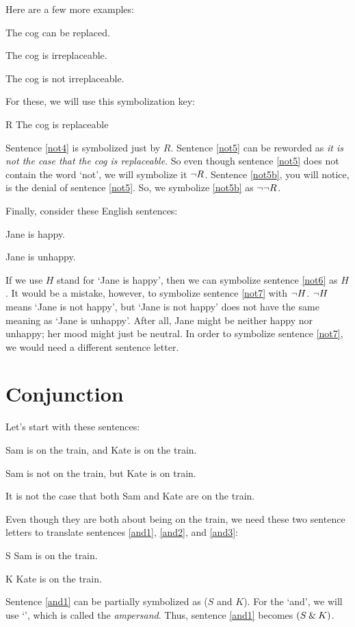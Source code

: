 Here are a few more examples:
	\begin{earg}
		\item[\ex{not4}] The cog can be replaced.
		\item[\ex{not5}] The cog is irreplaceable.
		\item[\ex{not5b}] The cog is not irreplaceable.
	\end{earg}
For these, we will use this symbolization key:
	\begin{ekey}
		\item[R] The cog is replaceable
	\end{ekey}
Sentence \ref{not4} is symbolized just by $R$. Sentence \ref{not5} can be reworded as \textit{it is not the case that the cog is replaceable}. So even though sentence \ref{not5} does not contain the word `not', we will symbolize it ${\neg} R$.
Sentence \ref{not5b}, you will notice, is the denial of sentence \ref{not5}. So, we symbolize \ref{not5b} as ${\neg}{\neg} R$.

Finally, consider these English sentences:
	\begin{earg}
		\item[\ex{not6}] Jane is happy.
		\item[\ex{not7}] Jane is unhappy.
	\end{earg}
If we use $H$ stand for `Jane is happy', then we can symbolize sentence \ref{not6} as $H$. It would be a mistake, however, to symbolize sentence \ref{not7} with ${\neg}{H}$. 
${\neg}{H}$ means `Jane is not happy', but `Jane is not happy' does not have the same meaning as `Jane is unhappy'. After all, Jane might be neither happy nor unhappy; her mood might just be neutral. In order to symbolize sentence \ref{not7}, we would need a different sentence letter.


\section{Conjunction}
\label{s:ConnectiveConjunction}

Let's start with these sentences:
	\begin{earg}
		\item[\ex{and1}] Sam is on the train, and Kate is on the train.
		\item[\ex{and2}] Sam is not on the train, but Kate is on train.
		\item[\ex{and3}] It is not the case that both Sam and Kate are on the train.
	\end{earg}
Even though they are both about being on the train, we need these two sentence letters to translate sentences \ref{and1}, \ref{and2}, and \ref{and3}:
	\begin{ekey}
		\item[S] Sam is on the train.
		\item[K] Kate is on the train.
	\end{ekey}
Sentence \ref{and1} can be partially symbolized as ($S$ and $K$). For the `and', we will use `\eand', which is called the \textit{ampersand}. Thus, sentence \ref{and1} becomes $(S\mathbin{\&} K)$. 

